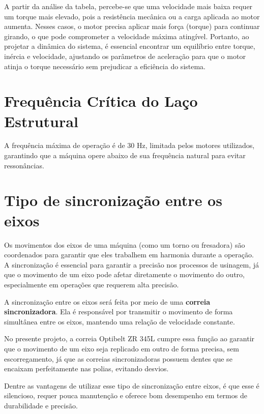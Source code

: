 A partir da análise da tabela, percebe-se que uma velocidade mais baixa requer um torque mais elevado, pois a resistência mecânica ou a carga aplicada ao motor aumenta. Nesses casos, o motor precisa aplicar mais força (torque) para continuar girando, o que pode comprometer a velocidade máxima atingível. Portanto, ao projetar a dinâmica do sistema, é essencial encontrar um equilíbrio entre torque, inércia e velocidade, ajustando os parâmetros de aceleração para que o motor atinja o torque necessário sem prejudicar a eficiência do sistema.

\newpage
\section{Frequência Crítica do Laço Estrutural}

A frequência máxima de operação é de 30 Hz, limitada pelos motores utilizados, garantindo que a máquina opere abaixo de sua frequência natural para evitar ressonâncias.

\section{Tipo de sincronização entre os eixos}

Os movimentos dos eixos de uma máquina (como um torno ou fresadora) são coordenados para garantir que eles trabalhem em harmonia durante a operação. A sincronização é essencial para garantir a precisão nos processos de usinagem, já que o movimento de um eixo pode afetar diretamente o movimento do outro, especialmente em operações que requerem alta precisão.

A sincronização entre os eixos será feita por meio de uma \textbf{correia sincronizadora}. Ela é responsável por transmitir o movimento de forma simultânea entre os eixos, mantendo uma relação de velocidade constante. 

No presente projeto, a correia Optibelt ZR 345L cumpre essa função ao garantir que o movimento de um eixo seja replicado em outro de forma precisa, sem escorregamento, já que as correias sincronizadoras possuem dentes que se encaixam perfeitamente nas polias, evitando desvios.

Dentre as vantagens de utilizar esse tipo de sincronização entre eixos, é que esse é silencioso, requer pouca manutenção e oferece bom desempenho em termos de durabilidade e precisão.


